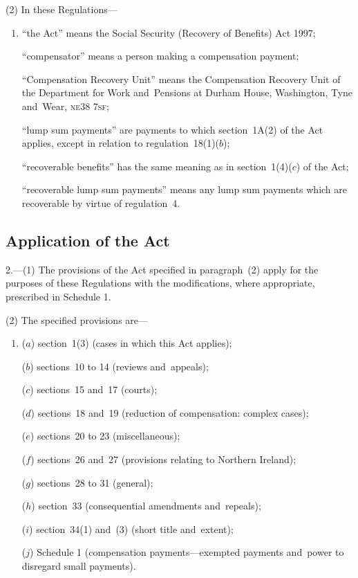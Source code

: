 \documentclass[12pt,a4paper]{article}
\begin{document}
(2) In these Regulations—
\begin{enumerate}\item[]
“the Act” means the Social Security (Recovery of Benefits) Act 1997;

“compensator” means a person making a compensation payment;

“Compensation Recovery Unit” means the Compensation Recovery Unit of the Department for Work and~Pensions at Durham House, Washington, Tyne and~Wear, \textsc{\lowercase{NE38 7SF}};

“lump sum payments” are payments to which section~1A(2) of the Act applies, except in relation to regulation~18(1)($b$);

“recoverable benefits” has the same meaning as in section~1(4)($c$)  of the Act;

“recoverable lump sum payments” means any lump sum payments which are recoverable by virtue of regulation~4.
\end{enumerate}

\subsection[2. Application of the Act]{Application of the Act}

2.---(1)  The provisions of the Act specified in paragraph~(2) apply for the purposes of these Regulations with the modifications, where appropriate, prescribed in Schedule 1.

(2) The specified provisions are—
\begin{enumerate}\item[]
($a$) section~1(3) (cases in which this Act applies);

($b$) sections~10 to 14 (reviews and~appeals);

($c$) sections~15 and~17 (courts);

($d$) sections~18 and~19 (reduction of compensation: complex cases);

($e$) sections~20 to 23 (miscellaneous);

($f$) sections~26 and~27 (provisions relating to Northern Ireland);

($g$) sections~28 to 31 (general);

($h$) section~33 (consequential amendments and~repeals);

($i$) section~34(1) and~(3) (short title and~extent);

($j$) Schedule 1 (compensation payments---exempted payments and~power to disregard small payments).
\end{enumerate}
\end{document}
